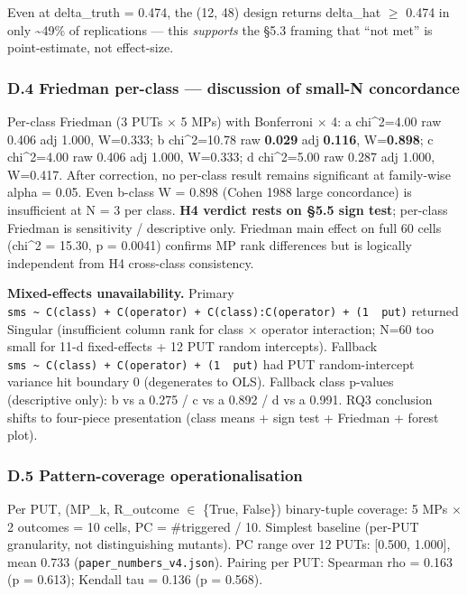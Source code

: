 \documentclass[review,12pt,authoryear]{elsarticle}
\begin{document}
Even at delta\_truth = 0.474, the (12, 48) design returns delta\_hat $\geq$
0.474 in only \textasciitilde49\% of replications --- this
\emph{supports} the §5.3 framing that ``not met'' is point-estimate, not
effect-size.

\subsubsection{D.4 Friedman per-class --- discussion of small-N
concordance}\label{d.4-friedman-per-class-discussion-of-small-n-concordance}

Per-class Friedman (3 PUTs $\times$ 5 MPs) with Bonferroni $\times$ 4: a chi\^{}2=4.00
raw 0.406 adj 1.000, W=0.333; b chi\^{}2=10.78 raw \textbf{0.029} adj
\textbf{0.116}, W=\textbf{0.898}; c chi\^{}2=4.00 raw 0.406 adj 1.000,
W=0.333; d chi\^{}2=5.00 raw 0.287 adj 1.000, W=0.417. After correction,
no per-class result remains significant at family-wise alpha = 0.05.
Even b-class W = 0.898 (Cohen 1988 large concordance) is insufficient at
N = 3 per class. \textbf{H4 verdict rests on §5.5 sign test}; per-class
Friedman is sensitivity / descriptive only. Friedman main effect on full
60 cells (chi\^{}2 = 15.30, p = 0.0041) confirms MP rank differences but
is logically independent from H4 cross-class consistency.

\textbf{Mixed-effects unavailability.} Primary
\texttt{sms\ \textasciitilde{}\ C(class)\ +\ C(operator)\ +\ C(class):C(operator)\ +\ (1\ \textbar{}\ put)}
returned Singular (insufficient column rank for class $\times$ operator
interaction; N=60 too small for 11-d fixed-effects + 12 PUT random
intercepts). Fallback
\texttt{sms\ \textasciitilde{}\ C(class)\ +\ C(operator)\ +\ (1\ \textbar{}\ put)}
had PUT random-intercept variance hit boundary 0 (degenerates to OLS).
Fallback class p-values (descriptive only): b vs a 0.275 / c vs a 0.892
/ d vs a 0.991. RQ3 conclusion shifts to four-piece presentation (class
means + sign test + Friedman + forest plot).

\subsubsection{D.5 Pattern-coverage
operationalisation}\label{d.5-pattern-coverage-operationalisation}

Per PUT, (MP\_k, R\_outcome $\in$ \{True, False\}) binary-tuple coverage: 5
MPs $\times$ 2 outcomes = 10 cells, PC = \#triggered / 10. Simplest baseline
(per-PUT granularity, not distinguishing mutants). PC range over 12
PUTs: {[}0.500, 1.000{]}, mean 0.733 (\texttt{paper\_numbers\_v4.json}).
Pairing per PUT: Spearman rho = 0.163 (p = 0.613); Kendall tau = 0.136
(p = 0.568).
\end{document}
